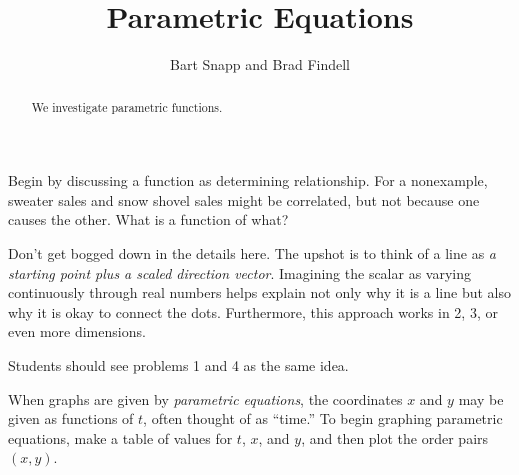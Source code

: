 \documentclass[nooutcomes]{ximera}
\title{Parametric Equations}
\author{Bart Snapp and Brad Findell}
\begin{document}
\begin{abstract}
  We investigate parametric functions.
\end{abstract}
\maketitle

\begin{teachingnote}
Begin by discussing a function as determining relationship.  For a nonexample, sweater sales and snow shovel sales might be correlated, but not because one causes the other.  What is a function of what?  

Don't get bogged down in the details here.  The upshot is to think of a line as \emph{a starting point plus a scaled direction vector}.  Imagining the scalar as varying continuously through real numbers helps explain not only why it is a line but also why it is okay to connect the dots.  Furthermore, this approach works in 2, 3, or even more dimensions.  

Students should see problems 1 and 4 as the same idea.  
\end{teachingnote}

%

\begin{definition}
When graphs are given by \emph{parametric equations}, the coordinates $x$ and $y$ may be given as functions of $t$, often thought of as ``time.''  To begin graphing parametric equations, make a table of values for $t$, $x$, and $y$, and then plot the order pairs $(x, y)$.  
\end{definition}
\end{document}
